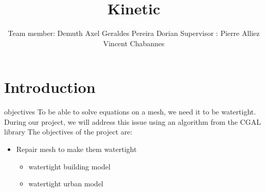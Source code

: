 \documentclass[10pt]{beamer}
\title{Kinetic}
\author{Team member: \newline\newline Demuth Axel \newline Geraldes Pereira Dorian \newline\newline Supervisor :  \newline\newline Pierre Alliez \newline Vincent Chabannes}
\date{}
\begin{document}
\frame{\titlepage}
\begin{frame}
    \tableofcontents
\end{frame}
\section{Introduction}

\begin{frame}[plain]{objectives}
    To be able to solve equations on a mesh, we need it to be watertight. During our project, we will address this issue using an algorithm from the CGAL library
    \newline\newline The objectives of the project are:
    \newline
    \begin{itemize}
        \item Repair mesh to make them watertight 
        \newline
        \begin{itemize}
            \item watertight building model
            \newline
            \item watertight urban model
        \end{itemize}

    \end{itemize}
\end{frame}
\end{document}
